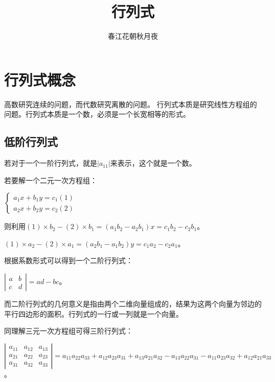 \documentclass[UTF8, 12pt]{ctexart}
\author{春江花朝秋月夜}
\title{行列式}
\date{}
\begin{document}
    \maketitle
    \pagestyle{empty}
    \thispagestyle{empty}
    \tableofcontents
    \thispagestyle{empty}
    \newpage
    \pagestyle{plain}
    \setcounter{page}{1}

    \section{行列式概念}
    高数研究连续的问题，而代数研究离散的问题。
    行列式本质是研究线性方程组的问题。行列式本质是一个数，必须是一个长宽相等的形式。
    \subsection{低阶行列式}

    若对于一个一阶行列式，就是$\vert a_11\vert$来表示，这个就是一个数。

    若要解一个二元一次方程组：

    $\begin{cases}
         a_1x+b_1y=c_1 (1) \\
         a_2x+b_2y=c_2 (2)
    \end{cases}
    $

    则利用$(1)\times b_2-(2)\times b_1=(a_1b_2-a_2b_1)x=c_1b_2-c_2b_1$。

    $(1)\times a_2-(2)\times a_1=(a_2b_1-a_1b_2)y=c_1a_2-c_2a_1$。

    根据系数形式可以得到一个二阶行列式：

    $
    \left|\begin{array}{cc}
              a & b \\
              c & d
    \end{array}\right|
    =ad-bc$。

    而二阶行列式的几何意义是指由两个二维向量组成的，结果为这两个向量为邻边的平行四边形的面积。行列式的一行或一列就是一个向量。

    同理解三元一次方程组可得三阶行列式：

    $
    \left|\begin{array}{ccc}
              a_{11} & a_{12} & a_{13} \\
              a_{21} & a_{22} & a_{23} \\
              a_{31} & a_{32} & a_{33}
    \end{array}\right|
    =a_{11}a_{22}a_{33}+a_{12}a_{23}a_{31}+a_{13}a_{21}a_{32}-a_{13}a_{22}a_{31}-a_{11}a_{23}a_{32}+a_{12}a_{21}a_{33}$。
\end{document}
